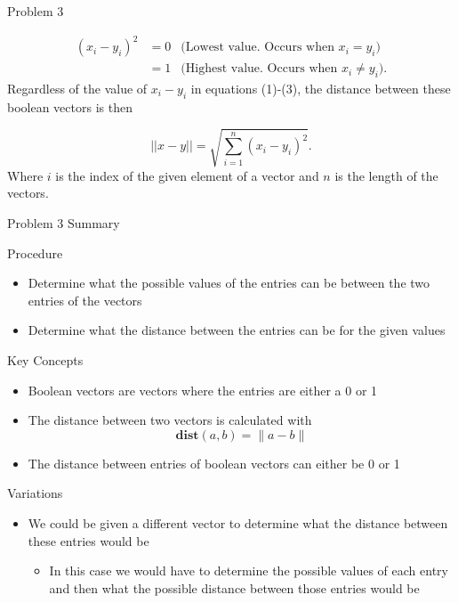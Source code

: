 \begin{problem}{Problem 3}
\begin{Highlight}[Solution]
        \begin{align}
            (x_{i} - y_{i})^{2} & = 0 & \text{(Lowest value. Occurs when $x_{i}=y_{i}$)} \\
            & = 1 & \text{(Highest value. Occurs when $x_{i} \neq y_{i}$)}.
        \end{align}
        Regardless of the value of $x_{i} - y_{i}$ in equations (1)-(3), the distance between these boolean vectors is then 

        \begin{equation}
            ||x - y|| = \sqrt{\sum^{n}_{i = 1}(x_{i} - y_{i})^{2}}.
        \end{equation}
        Where $i$ is the index of the given element of a vector and $n$ is the length of the vectors.
    \end{Highlight}
\end{problem}

\begin{summary}{Problem 3 Summary}
    \begin{statement}{Procedure}
        \begin{itemize}
            \item Determine what the possible values of the entries can be between the two entries of the vectors
            \item Determine what the distance between the entries can be for the given values
        \end{itemize}
    \end{statement}
    \begin{statement}{Key Concepts}
        \begin{itemize}
            \item Boolean vectors are vectors where the entries are either a 0 or 1
            \item The distance between two vectors is calculated with 
            \begin{equation*}
                \mathbf{dist}(a,b) = \|a - b\|
            \end{equation*}
            \item The distance between entries of boolean vectors can either be 0 or 1
        \end{itemize}
    \end{statement}
    \begin{statement}{Variations}
        \begin{itemize}
            \item We could be given a different vector to determine what the distance between these entries would be
            \begin{itemize}
                \item In this case we would have to determine the possible values of each entry and then what the possible distance between those entries would be
            \end{itemize}
        \end{itemize}
    \end{statement}
\end{summary}

